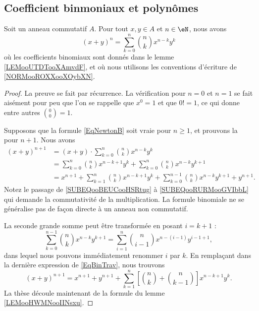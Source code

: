 \subsection{Coefficient binmoniaux et polynômes}


\begin{proposition}     \label{PropBinomFExOiL}
	Soit un anneau commutatif \( A\). Pour tout \( x,y\in A\) et \( n\in \eN\), nous avons
	\begin{equation}        \label{EqNewtonB}
		(x+y)^n=\sum_{k=0}^n{n\choose k}x^{n-k}y^k
	\end{equation}
	où les coefficients binomiaux sont donnés dans le lemme \ref{LEMooUTDTooXAmvdF}, et où nous utilisons les conventions d'écriture de \ref{NORMooROXXooXOybXN}.
\end{proposition}

\begin{proof}
	La preuve se fait par récurrence. La vérification pour \( n=0\) et \( n=1\) se fait aisément pour peu que l'on se rappelle que \( x^0=1\) et que \( 0!=1\), ce qui donne entre autres \( {0\choose 0}=1\).

	Supposons que la formule \eqref{EqNewtonB} soit vraie pour \( n\geq1\), et prouvons la pour \( n+1\). Nous avons
	\begin{subequations}\label{EqBinTrav}
		\begin{align}
			(x+y)^{n+1} & = (x+y)\cdot \sum_{k=0}^n{n\choose k}x^{n-k}y^k                                                  \label{SUBEQooBEUCooHSRtug}  \\
			            & = \sum_{k=0}^n{n\choose k}x^{n-k+1}y^k+\sum_{k=0}^n{n\choose k}x^{n-k}y^{k+1}                     \label{SUBEQooRURMooGVIbbL} \\
			            & = x^{n+1}+ \sum_{k=1}^n{n\choose k}x^{n-k+1}y^k+\sum_{k=0}^{n-1}{n\choose k}x^{n-k}y^{k+1}+y^{n+1}.
		\end{align}
	\end{subequations}
	Notez le passage de \eqref{SUBEQooBEUCooHSRtug} à \eqref{SUBEQooRURMooGVIbbL} qui demande la commutativité de la multiplication. La formule binomiale ne se généralise pas de façon directe à un anneau non commutatif.

	La seconde grande somme peut être transformée en posant \( i=k+1\) :
	\begin{equation}
		\sum_{k=0}^{n-1}{n\choose k}x^{n-k}y^{k+1} = \sum_{i=1}^n{n\choose i-1}x^{n-(i-1)}y^{i-1+1},
	\end{equation}
	dans lequel nous pouvons immédiatement renommer \( i\) par \( k\). En remplaçant dans la dernière expression de \eqref{EqBinTrav}, nous trouvons
	\begin{equation}
		(x+y)^{n+1}=x^{n+1}+y^{n+1}+\sum_{k=1}^n\left[ {n\choose k}+{n\choose k-1} \right]x^{n-k+1}y^k.
	\end{equation}
	La thèse découle maintenant de la formule du lemme \ref{LEMooHWMNooIINsxu}.
\end{proof}

